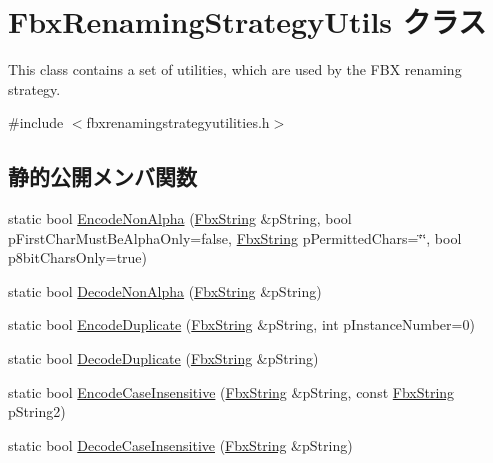 \hypertarget{class_fbx_renaming_strategy_utils}{}\section{Fbx\+Renaming\+Strategy\+Utils クラス}
\label{class_fbx_renaming_strategy_utils}


This class contains a set of utilities, which are used by the F\+BX renaming strategy.  




{\ttfamily \#include $<$fbxrenamingstrategyutilities.\+h$>$}

\subsection*{静的公開メンバ関数}
\begin{DoxyCompactItemize}
\item 
static bool \hyperlink{class_fbx_renaming_strategy_utils_aa17397b689280294198b5d445c67c95b}{Encode\+Non\+Alpha} (\hyperlink{class_fbx_string}{Fbx\+String} \&p\+String, bool p\+First\+Char\+Must\+Be\+Alpha\+Only=false, \hyperlink{class_fbx_string}{Fbx\+String} p\+Permitted\+Chars=\char`\"{}\char`\"{}, bool p8bit\+Chars\+Only=true)
\item 
static bool \hyperlink{class_fbx_renaming_strategy_utils_a9ba422882bbd76f388037c75c06ff0e5}{Decode\+Non\+Alpha} (\hyperlink{class_fbx_string}{Fbx\+String} \&p\+String)
\item 
static bool \hyperlink{class_fbx_renaming_strategy_utils_a0d730b3587ae258f9ba1396080a3028f}{Encode\+Duplicate} (\hyperlink{class_fbx_string}{Fbx\+String} \&p\+String, int p\+Instance\+Number=0)
\item 
static bool \hyperlink{class_fbx_renaming_strategy_utils_a52105ea9c53b3a5bdb064435b6027f7b}{Decode\+Duplicate} (\hyperlink{class_fbx_string}{Fbx\+String} \&p\+String)
\item 
static bool \hyperlink{class_fbx_renaming_strategy_utils_a8f0edabcf187fd49359f095008e38df1}{Encode\+Case\+Insensitive} (\hyperlink{class_fbx_string}{Fbx\+String} \&p\+String, const \hyperlink{class_fbx_string}{Fbx\+String} p\+String2)
\item 
static bool \hyperlink{class_fbx_renaming_strategy_utils_a9f252cd7a3b44f25e7bb421e11acc512}{Decode\+Case\+Insensitive} (\hyperlink{class_fbx_string}{Fbx\+String} \&p\+String)
\end{DoxyCompactItemize}



